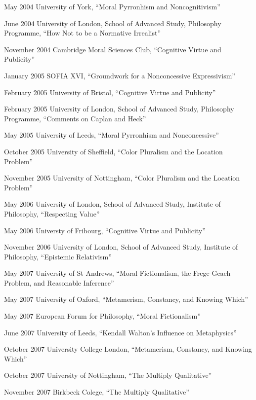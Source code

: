 \documentclass[contbibnum]{cv}
\begin{document}
\begin{topic}
    \item[May 2004] University of York, ``Moral Pyrronhism and Noncognitivism''
    \item[June 2004] University of London, School of Advanced Study, Philosophy Programme, ``How Not to be a Normative Irrealist''
    \item[November 2004] Cambridge Moral Sciences Club, ``Cognitive Virtue and Publicity''
    \item[January 2005] SOFIA XVI, ``Groundwork for a Nonconcessive Expressivism''
    \item[February 2005] University of Bristol, ``Cognitive Virtue and Publicity''
    \item[February 2005] University of London, School of Advanced Study, Philosophy Programme, ``Comments on Caplan and Heck''
    \item[May 2005] University of Leeds, ``Moral Pyrronhism and Nonconcessive''
    \item[October 2005] University of Sheffield, ``Color Pluralism and the Location Problem''
    \item[November 2005] University of Nottingham, ``Color Pluralism and the Location Problem''
    \item[May 2006] University of London, School of Advanced Study, Institute of Philosophy, ``Respecting Value''
    \item[May 2006] Universty of Fribourg, ``Cognitive Virtue and Publicity''
    \item[November 2006] University of London, School of Advanced Study, Institute of Philosophy, ``Epistemic Relativism''
    \item[May 2007] University of St Andrews, ``Moral Fictionalism, the Frege-Geach Problem, and Reasonable Inference''
    \item[May 2007] University of Oxford, ``Metamerism, Constancy, and Knowing Which''
    \item[May 2007] European Forum for Philosophy, ``Moral Fictionalism''
    \item[June 2007] University of Leeds, ``Kendall Walton's Influence on Metaphysics''
    \item [October 2007] University College London, ``Metamerism, Constancy, and Knowing Which''
    \item[October 2007] University of Nottingham, ``The Multiply Qualitative''
    \item[November 2007] Birkbeck Colege, ``The Multiply Qualitative''
\end{topic}


\nocite{Kalderon:1987lr}
\nocite{Kalderon:1996fk}
\nocite{Kalderon:1997lr}
\nocite{Kalderon:2000qy}
\nocite{Kalderon:2001qf}
\nocite{Kalderon:2004lr}
\nocite{Kalderon:2005gz}
\nocite{Kalderon:2005lr}
\nocite{Kalderon:2006fk}
\nocite{Kalderon:2006tg}
\nocite{Kalderon:2007fk}
\nocite{Kalderon:2007qy}
\nocite{Kalderon:2006fk}
\nocite{Kalderon:2007lr}
\nocite{Kalderon:2007mr}
\nocite{Kalderon:2007gk}
\nocite{Kalderon:2007qy}
\nocite{Skiadas:2007lr}
\nocite{Hilbert:2000on}

 

\end{document}

